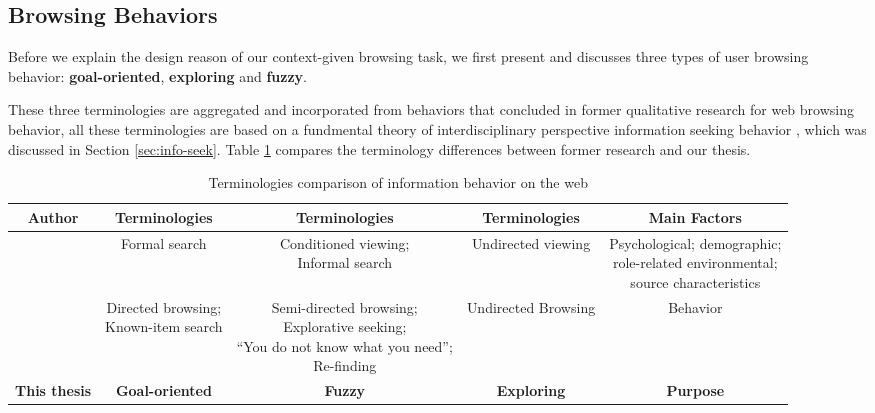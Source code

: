 


\subsection{Browsing Behaviors}
\label{sec:behavior}

Before we explain the design reason of our context-given browsing task, 
we first present and discusses three types of user browsing behavior: 
\textbf{goal-oriented}, \textbf{exploring} and \textbf{fuzzy}.

These three terminologies are aggregated and incorporated from behaviors that concluded 
in former qualitative research for web browsing behavior, 
all these terminologies are based on a fundmental theory of 
interdisciplinary perspective information seeking behavior \cite{wilson1997information},
which was discussed in Section \ref{sec:info-seek}.
Table \ref{table:info-seek} compares the terminology differences between former research 
and our thesis.

\begin{table}[H]
    \small
    \centering
    \caption{Terminologies comparison of information behavior on the web}
    \begin{adjustbox}{width=\textwidth}
        \begin{tabular}{ccccc}
            \toprule
            \textbf{Author} & \textbf{Terminologies} & \textbf{Terminologies} & \textbf{Terminologies} & \textbf{Main Factors} \\
            \hline
            \cite{choo1999information} & Formal search & \makecell{Conditioned viewing; \\ Informal search} & Undirected viewing & \makecell{Psychological; demographic;\\ role-related environmental; \\source characteristics} \\
            \cite{johnson2017patterns} & \makecell{Directed browsing; \\Known-item search} & \makecell{Semi-directed browsing; \\Explorative seeking; \\``You do not know what you need''; \\Re-finding} & Undirected Browsing & Behavior \\
            \textbf{This thesis} & \textbf{Goal-oriented} & \textbf{Fuzzy} & \textbf{Exploring} & \textbf{Purpose} \\
            \bottomrule
        \end{tabular}
        \label{table:info-seek}
    \end{adjustbox}
\end{table}

